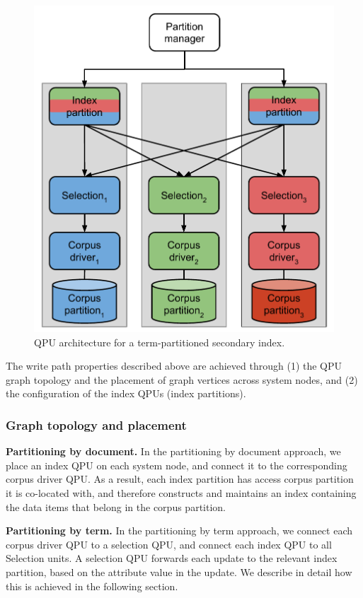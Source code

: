 \begin{figure}
\begin{minipage}{.5\textwidth}
    \includegraphics[scale=0.5]{./figures/case_studies/index_partitioned_by_term.pdf}
    \caption{QPU architecture for a term-partitioned secondary index.}
    \label{fig:index_partitioned_by_term}
  \end{minipage}
\end{figure}

The write path properties described above are achieved through (1) the QPU graph topology and the placement of graph vertices across system nodes,
and (2) the configuration of the index QPUs (index partitions).

\subsubsection{Graph topology and placement}

\medskip
\noindent
\textbf{Partitioning by document.}
In the partitioning by document approach, we place an index QPU on each system node,
and connect it to the corresponding corpus driver QPU.
As a result, each index partition has access corpus partition it is co-located with,
and therefore constructs and maintains an index containing the data items that belong in the corpus partition.

\medskip
\noindent
\textbf{Partitioning by term.}
In the partitioning by term approach,
we connect each corpus driver QPU to a selection QPU,
and connect each index QPU to all Selection units.
A selection QPU forwards each update to the relevant index partition,
based on the attribute value in the update.
We describe in detail how this is achieved in the following section.
